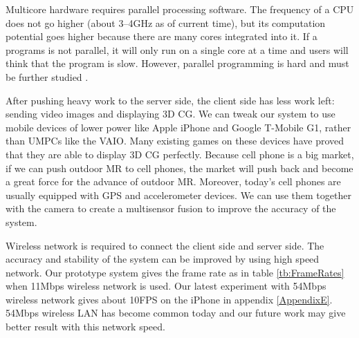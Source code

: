 Multicore hardware requires parallel processing software. The frequency of a CPU does not go higher (about 3--4GHz as of current time), but its computation potential goes higher because there are many cores integrated into it. If a programs is not parallel, it will only run on a single core at a time and users will think that the program is slow. However, parallel programming is hard and must be further studied \cite{Reference17}.

After pushing heavy work to the server side, the client side has less work left: sending video images and displaying 3D CG. We can tweak our system to use mobile devices of lower power like Apple iPhone and Google T-Mobile G1, rather than UMPCs like the VAIO. Many existing games on these devices have proved that they are able to display 3D CG perfectly. Because cell phone is a big market, if we can push outdoor MR to cell phones, the market will push back and become a great force for the advance of outdoor MR. Moreover, today's cell phones are usually equipped with GPS and accelerometer devices. We can use them together with the camera to create a multisensor fusion \cite{Reference14} to improve the accuracy of the system.

Wireless network is required to connect the client side and server side. The accuracy and stability of the system can be improved by using high speed network. Our prototype system gives the frame rate as in table \ref{tb:FrameRates} when 11Mbps wireless network is used. Our latest experiment with 54Mbps wireless network gives about 10FPS on the iPhone in appendix \ref{AppendixE}. 54Mbps wireless LAN has become common today and our future work may give better result with this network speed.

